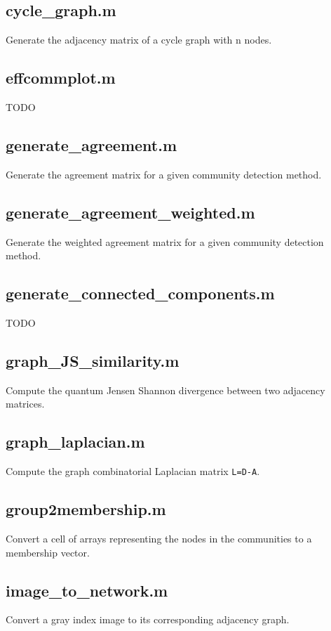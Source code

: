 \documentclass[a4paper]{report}
\begin{document}
  \subsection*{cycle\_graph.m} Generate the adjacency matrix of a cycle graph
  with n nodes.

  \subsection*{effcommplot.m} TODO

  \subsection*{generate\_agreement.m} Generate the agreement matrix for a
  given community detection method.

  \subsection*{generate\_agreement\_weighted.m} Generate the weighted
  agreement matrix for a given community detection method.

  \subsection*{generate\_connected\_components.m} TODO

  \subsection*{graph\_JS\_similarity.m} Compute the quantum Jensen Shannon
  divergence between two adjacency matrices.

  \subsection*{graph\_laplacian.m} Compute the graph combinatorial Laplacian
  matrix \texttt{L=D-A}.

  \subsection*{group2membership.m} Convert a cell of arrays representing the
  nodes in the communities to a membership vector.

  \subsection*{image\_to\_network.m} Convert a gray index image to its
  corresponding adjacency graph.
\end{document}
